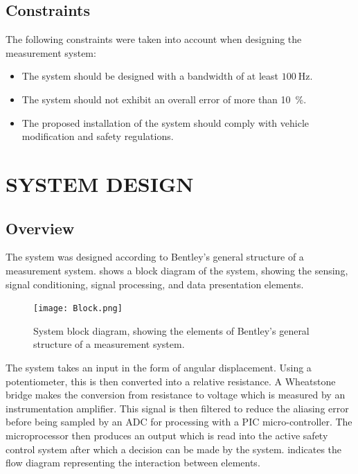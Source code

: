 \documentclass[10pt,twocolumn]{witseiepaper}
\begin{document}
\subsection{Constraints}

The following constraints were taken into account when designing the measurement system:
\begin{itemize}
	\item The system should be designed with a bandwidth of at least $\mathrm{100~Hz}$.
	\item The system should not exhibit an overall error of more than 10~\%.
	\item The proposed installation of the system should comply with vehicle modification and safety regulations.
\end{itemize}

\section{SYSTEM DESIGN}

\subsection{Overview}

The system was designed according to Bentley's general structure of a measurement system.  shows a block diagram of the system, showing the sensing, signal conditioning, signal processing, and data presentation elements.

\begin{figure}[]
	\centering
	\texttt{[image: Block.png]}
	\vspace{0.15cm}
	\caption{System block diagram, showing the elements of Bentley's general structure of a measurement system.}
	\label{fig:block}
\end{figure}

The system takes an input in the form of angular displacement. Using a potentiometer, this is then converted into a relative resistance. A Wheatstone bridge makes the conversion from resistance to voltage which is measured by an instrumentation amplifier. This signal is then filtered to reduce the aliasing error before being sampled by an ADC for processing with a PIC micro-controller. The microprocessor then produces an output which is read into the active safety control system after which a decision can be made by the system.  indicates the flow diagram representing the interaction between elements.
\end{document}
